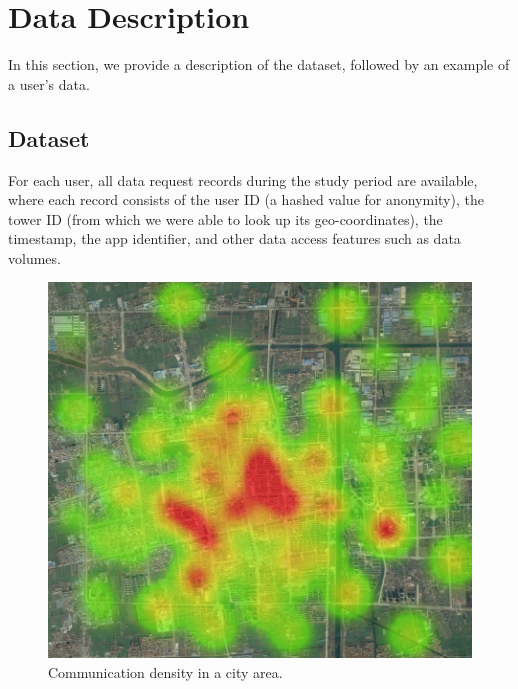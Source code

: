 \section{Data Description}\label{data}

In this section, we provide a description of the dataset,
followed by an example of a user's data.

\subsection{Dataset}

For each user, all data request records during the study period are available,
where each record consists of the user ID (a hashed value for anonymity),
the tower ID (from which we were able to look up its geo-coordinates),
the timestamp,
the app identifier,
and other data access features such as data volumes.


 \begin{figure}[h]
     \centering
     \includegraphics[width=0.4\linewidth]{./figures/hotmap.jpg}
     \caption{Communication density in a city area.}
     \label{fig:city_sample}
     \vspace{-0.1in}
 \end{figure}

